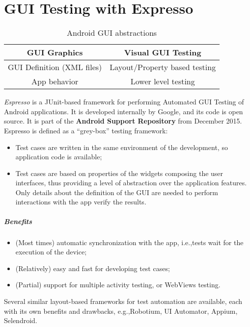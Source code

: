 \appendix
\chapter{GUI Testing with Expresso}
\begin{table}
\centering
\begin{tabular}{|c|c|}
\hline 
GUI Graphics & Visual GUI Testing \\ 
\hline 
GUI Definition (XML files) & Layout/Property based testing \\ 
\hline 
App behavior & Lower level testing \\ 
\hline 
\end{tabular}
\caption{Android GUI abstractions}
\end{table}

\emph{Espresso} is a JUnit-based framework for performing Automated GUI Testing of Android applications. It is developed internally by Google, and its code is open source. It is part of the \textbf{Android Support Repository} from December 2015. Espresso is defined as a ``grey-box'' testing framework:
\begin{itemize}
\item Test cases are written in the same environment of the development, so application code is available;
\item Test cases are based on properties of the widgets composing the user interfaces, thus providing a level of abstraction over the application features. Only details about the definition of the GUI are needed to perform interactions with the app verify the results.
\end{itemize}

\paragraph{Benefits}
\begin{itemize}
\item (Most times) automatic synchronization with the app, i.e.,\@ tests wait for the execution of the device;
\item (Relatively) easy and fast for developing test cases;
\item (Partial) support for multiple activity testing, or WebViews testing.
\end{itemize}

Several similar layout-based frameworks for test automation are available, each with its own benefits and drawbacks, e.g.,\@ Robotium, UI Automator, Appium, Selendroid.

